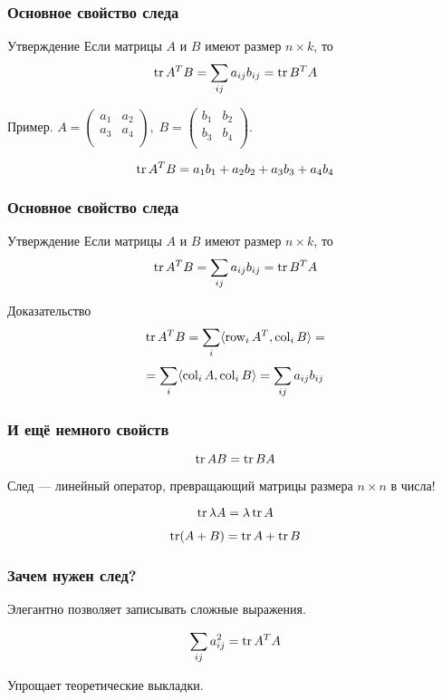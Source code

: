 \begin{frame}
    \frametitle{Основное свойство следа}

    \begin{block}{Утверждение}
        Если матрицы $A$ и $B$ имеют размер $n\times k$, то
        \[
        \trace A^T B = \sum_{ij} a_{ij} b_{ij} = \trace B^T A
        \]

    \end{block}
    \pause

    Пример. $A = \begin{pmatrix}
        a_1 & a_2 \\
        a_3 & a_4 \\ 
    \end{pmatrix},  \;
    B = \begin{pmatrix}
        b_1 & b_2 \\
        b_3 & b_4 \\ 
    \end{pmatrix}$.

    \[
    \trace A^T B = a_1 b_1 + a_2 b_2 + a_3 b_3 + a_4 b_4    
    \]

\end{frame}


\begin{frame}
    \frametitle{Основное свойство следа}

\begin{block}{Утверждение}
    Если матрицы $A$ и $B$ имеют размер $n\times k$, то
    \[
    \trace A^T B = \sum_{ij} a_{ij} b_{ij} = \trace B^T A
    \]

\end{block}
\pause

    \begin{block}{Доказательство}
        \[
        \trace A^T B = \sum_i \langle \row_i A^T, \col_i B \rangle =
        \]
        \[ 
         = \sum_i \langle \operatorname{col}_i A, \operatorname{col}_i B \rangle = \sum_{ij} a_{ij} b_{ij}
        \]
    \end{block}
    

\end{frame}


\begin{frame}
    \frametitle{И ещё немного свойств}

    \[
    \trace AB = \trace BA    
    \]
    \pause

    След — линейный оператор, превращающий матрицы размера $n\times n$ в числа!
    \pause

    \[
    \trace \lambda A = \lambda \trace A    
    \]


    \[
    \trace (A+B) = \trace A + \trace B
    \]


\end{frame}


\begin{frame}
    \frametitle{Зачем нужен след?}

    \pause
    Элегантно позволяет записывать сложные выражения.
    
    \[
    \sum_{ij} a_{ij}^2 = \trace A^T A    
    \]

    \pause
    
    Упрощает теоретические выкладки. 

\end{frame}



